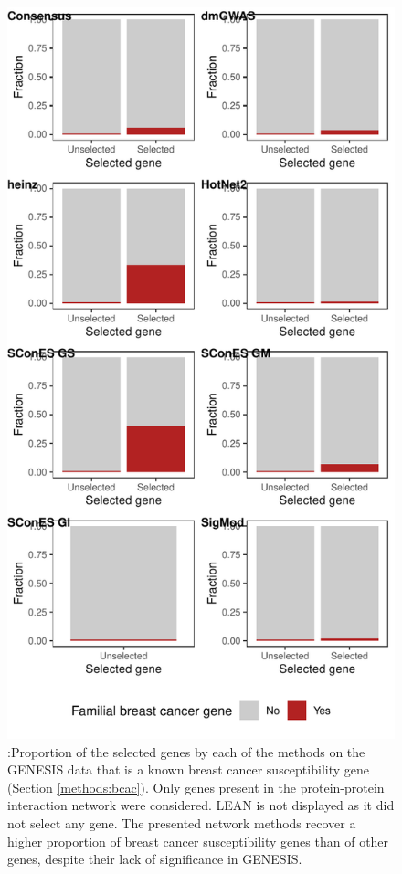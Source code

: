 \documentclass[twocolumn, 10pt]{article}
\begin{document}
\begin{figure}[htbp]
\centering
\includegraphics[width=\textwidth,height=\textheight,keepaspectratio]{./figures/sfigure_5.pdf}
\caption{\label{sfig:disgenet_comparison}
:Proportion of the selected genes by each of the methods on the GENESIS data that is a known breast cancer susceptibility gene (Section \ref{methods:bcac}). Only genes present in the protein-protein interaction network were considered. LEAN is not displayed as it did not select any gene. The presented network methods recover a higher proportion of breast cancer susceptibility genes than of other genes, despite their lack of significance in GENESIS.}
\end{figure}
\end{document}
